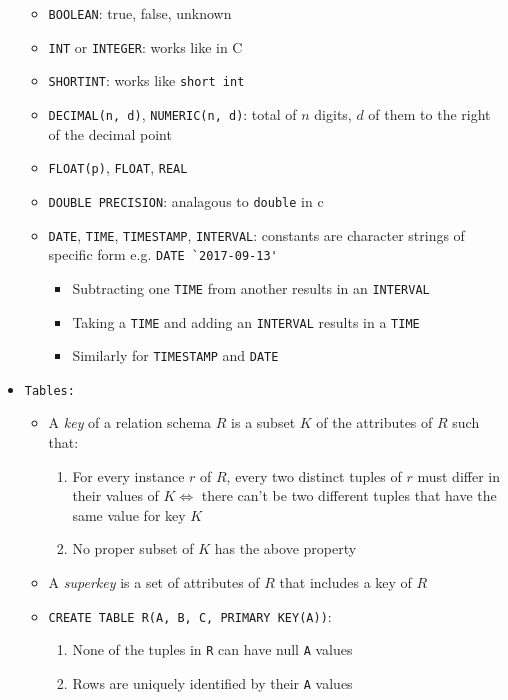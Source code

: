 \documentclass[landscape,8pt]{extarticle}
\newcommand{\code}{\lstinline}
\begin{document}
\begin{multicols}{4}
\begin{itemize}
\begin{itemize}
        \item \code{BOOLEAN}: true, false, unknown
        \item \code{INT} or \code{INTEGER}: works like in C
        \item \code{SHORTINT}: works like \code{short int}
        \item \code{DECIMAL(n, d)}, \code{NUMERIC(n, d)}: total of $n$ digits, $d$ of them to the
        right of the decimal point
        \item \code{FLOAT(p)}, \code{FLOAT}, \code{REAL}
        \item \code{DOUBLE PRECISION}: analagous to \code{double} in c
        \item \code{DATE}, \code{TIME}, \code{TIMESTAMP}, \code{INTERVAL}: constants are character
        strings of specific form e.g. \code{DATE `2017-09-13'}
        \begin{itemize}
            \item Subtracting one \code{TIME} from another results in an \code{INTERVAL}
            \item Taking a \code{TIME} and adding an \code{INTERVAL} results in a \code{TIME}
            \item Similarly for \code{TIMESTAMP} and \code{DATE}
        \end{itemize}
    \end{itemize}
    \item \code{Tables:} 
    \begin{itemize}
    \item A \emph{key} of a relation schema $R$ is a subset $K$ of the attributes of $R$ such that:
        \begin{enumerate}
            \item For every instance $r$ of $R$, every two distinct tuples of $r$ must differ in
            their values of $K \iff$ there can't be two different tuples that have the same value
            for key $K$
            \item No proper subset of $K$ has the above property
        \end{enumerate}
        \item A \emph{superkey} is a set of attributes of $R$ that includes a key of $R$
        \item \code{CREATE TABLE R(A, B, C, PRIMARY KEY(A))}:
        \begin{enumerate}
        \item None of the tuples in \code{R} can have null \code{A} values
        \item Rows are uniquely identified by their \code{A} values

\end{enumerate}
\end{itemize}
\end{itemize}
\end{multicols}
\end{document}
